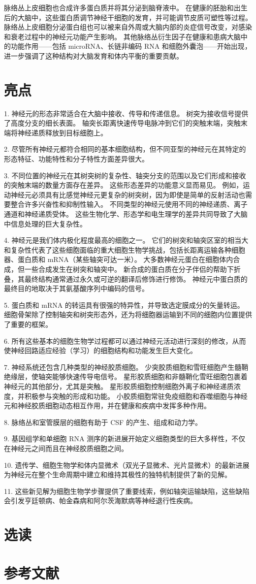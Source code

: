 脉络丛上皮细胞也合成许多蛋白质并将其分泌到脑脊液中。 在健康的胚胎和出生后的大脑中，这些蛋白质调节神经干细胞的发育，并可能调节皮质可塑性等过程。 脉络丛上皮细胞分泌蛋白组也可以被来自外周或大脑内部的炎症信号改变，对感染和衰老过程中的神经元功能产生影响。 其他脉络丛衍生因子在健康和患病大脑中的功能作用——包括 microRNA、长链非编码 RNA 和细胞外囊泡——开始出现，进一步强调了这种结构对大脑发育和体内平衡的重要贡献。

\section{亮点}

1. 神经元的形态非常适合在大脑中接收、传导和传递信息。 树突为接收信号提供了高度分支的细长表面。 轴突长距离快速传导电脉冲到它们的突触末端，突触末端将神经递质释放到目标细胞上。 

2. 尽管所有神经元都符合相同的基本细胞结构，但不同亚型的神经元在其特定的形态特征、功能特性和分子特性方面差异很大。 

3. 不同位置的神经元在其树突树的复杂性、轴突分支的范围以及它们形成和接收的突触末端的数量方面存在差异。 这些形态差异的功能意义显而易见。 例如，运动神经元必须具有比感觉神经元更复杂的树突树，因为即使是简单的反射活动也需要整合许多兴奋性和抑制性输入。 不同类型的神经元使用不同的神经递质、离子通道和神经递质受体。 这些生物化学、形态学和电生理学的差异共同导致了大脑中信息处理的巨大复杂性。 

4. 神经元是我们体内极化程度最高的细胞之一。 它们的树突和轴突区室的相当大和复杂性代表了这些细胞面临的重大细胞生物学挑战，包括长距离运输各种细胞器、蛋白质和 mRNA（某些轴突可达一米）。 大多数神经元蛋白在细胞体内合成，但一些合成发生在树突和轴突中。 新合成的蛋白质在分子伴侣的帮助下折叠，其最终结构通常通过永久或可逆的翻译后修饰进行修饰。 神经元中蛋白质的最终目的地取决于其氨基酸序列中编码的信号。 

5. 蛋白质和 mRNA 的转运具有很强的特异性，并导致选定膜成分的矢量转运。 细胞骨架除了控制轴突和树突形态外，还为将细胞器运输到不同的细胞内位置提供了重要的框架。 

6. 所有这些基本的细胞生物学过程都可以通过神经元活动进行深刻的修改，从而使神经回路适应经验（学习）的细胞结构和功能发生巨大变化。 

7. 神经系统还包含几种类型的神经胶质细胞。 少突胶质细胞和雪旺细胞产生髓鞘绝缘层，使轴突能够快速传导电信号。 星形胶质细胞和非髓鞘化雪旺细胞包裹着神经元的其他部分，尤其是突触。 星形胶质细胞控制细胞外离子和神经递质浓度，并积极参与突触的形成和功能。 小胶质细胞常驻免疫细胞和吞噬细胞与神经元和神经胶质细胞动态相互作用，并在健康和疾病中发挥多种作用。 

8. 脉络丛和室管膜层的细胞有助于 CSF 的产生、组成和动力学。 

9. 基因组学和单细胞 RNA 测序的新进展开始定义细胞类型的巨大多样性，不仅在神经元之间而且在神经胶质细胞之间。 

10. 遗传学、细胞生物学和体内显微术（双光子显微术、光片显微术）的最新进展为神经元在整个生命周期中建立和维持其极性的独特机制提供了新的见解。 

11. 这些新见解为细胞生物学步骤提供了重要线索，例如轴突运输缺陷，这些缺陷会引发亨廷顿病、帕金森病和阿尔茨海默病等神经退行性疾病。

\section{选读}

\section{参考文献}
